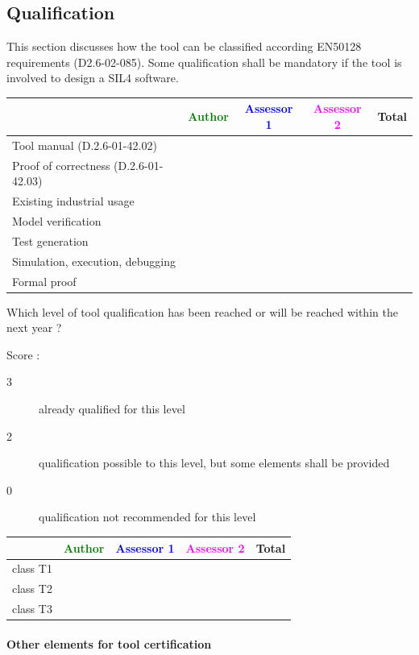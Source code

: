 \subsection{Qualification}

This section discusses how the tool can be classified according EN50128 requirements (D2.6-02-085). Some qualification shall be mandatory  if the tool is involved to design a SIL4 software.


\begin{tabular}{|l | c | c | c | c|}
\hline
& \textcolor{green}{Author} & \textcolor{blue}{Assessor 1} & \textcolor{magenta}{Assessor 2} & Total \\
\hline 
Tool manual (D.2.6-01-42.02) & & & &  \\
\hline
Proof of correctness (D.2.6-01-42.03)   & & & & \\
\hline
Existing industrial  usage  & & & & \\
\hline
Model verification & & & & \\
\hline
Test generation & & & & \\
\hline
Simulation, execution, debugging & & & & \\
\hline
Formal proof & & & & \\
\hline
\end{tabular}


Which level of tool qualification has been reached or will be reached within the next year ?

Score :
\begin{description}
\item[3] already qualified for this level
\item[2] qualification possible to this level, but some elements shall be provided
\item[0] qualification not recommended for this level
\end{description}


\begin{tabular}{|l | c | c | c | c|}
\hline
& \textcolor{green}{Author} & \textcolor{blue}{Assessor 1} & \textcolor{magenta}{Assessor 2} & Total \\
\hline 
class T1 & & & &  \\
\hline
class T2   & & & & \\
\hline
class T3  & & & & \\
\hline
\end{tabular}

\paragraph{Other elements for tool certification}


